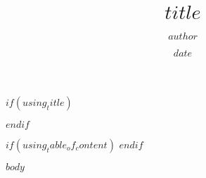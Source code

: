 \documentclass[12pt]{article}
\begin{document}
\title{$title$}
\author{$author$}
\date{$date$}

$if(using_title)$
\maketitle
$endif$

$if(using_table_of_content)$
\tableofcontents 
$endif$

$body$
\end{document}
